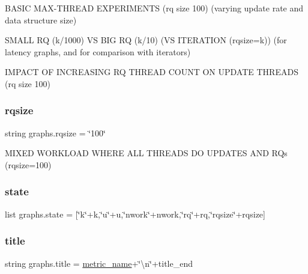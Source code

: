 B\+A\+S\+IC M\+A\+X-\/\+T\+H\+R\+E\+AD E\+X\+P\+E\+R\+I\+M\+E\+N\+TS (rq size 100) (varying update rate and data structure size) 

S\+M\+A\+LL RQ (k/1000) VS B\+IG RQ (k/10) (VS I\+T\+E\+R\+A\+T\+I\+ON (rqsize=k)) (for latency graphs, and for comparison with iterators)

I\+M\+P\+A\+CT OF I\+N\+C\+R\+E\+A\+S\+I\+NG RQ T\+H\+R\+E\+AD C\+O\+U\+NT ON U\+P\+D\+A\+TE T\+H\+R\+E\+A\+DS (rq size 100) \mbox{\label{namespacegraphs_ab34652bfd8c71e2cd2bd43e4e6524525}} 
\subsubsection{\texorpdfstring{rqsize}{rqsize}}
{\footnotesize\ttfamily string graphs.\+rqsize = \char`\"{}100\char`\"{}}



M\+I\+X\+ED W\+O\+R\+K\+L\+O\+AD W\+H\+E\+RE A\+LL T\+H\+R\+E\+A\+DS DO U\+P\+D\+A\+T\+ES A\+ND R\+Qs (rqsize=100) 

\mbox{\label{namespacegraphs_a7e28b4b5f2a57b0c7edebb674233cf1e}} 
\subsubsection{\texorpdfstring{state}{state}}
{\footnotesize\ttfamily list graphs.\+state = \mbox{[}\char`\"{}k\char`\"{}+k,\char`\"{}u\char`\"{}+u,\char`\"{}nwork\char`\"{}+nwork,\char`\"{}rq\char`\"{}+rq,\char`\"{}rqsize\char`\"{}+rqsize\mbox{]}}

\mbox{\label{namespacegraphs_a64551207fb3a71a0f3c293a3539f14e6}} 
\subsubsection{\texorpdfstring{title}{title}}
{\footnotesize\ttfamily string graphs.\+title = \hyperlink{namespacegraphs_a0c8becd7cf726f44e9c148109fcf06af}{metric\+\_\+name}+\char`\"{}\textbackslash{}n\char`\"{}+title\+\_\+end}

\mbox{\label{namespacegraphs_aa540bee28bd06e5b052021cfee6675c7}} 
